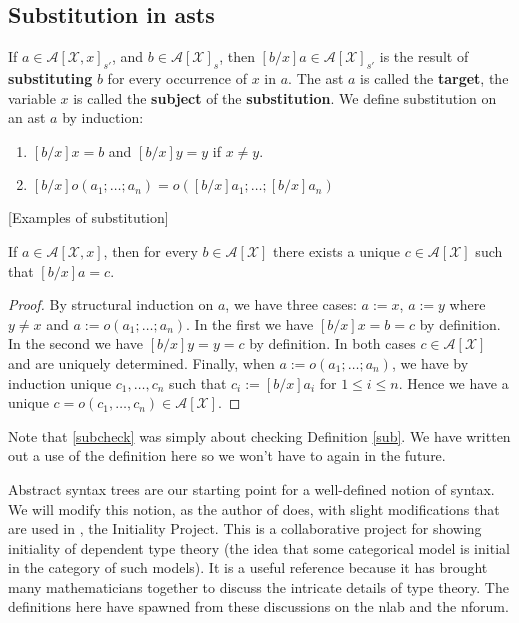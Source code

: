 \subsection{Substitution in asts}

\begin{defin}[Substitution]\label{sub}
    If $a \in \mathcal{A}[\mathcal{X},x]_{s'}$, and $b \in \mathcal{A}[\mathcal{X}]_s$, then $[b/x]a \in \mathcal{A}[\mathcal{X}]_{s'}$ is the result of \textbf{substituting} $b$ for every occurrence of $x$ in $a$. The ast $a$ is called the \textbf{target}, the variable $x$ is called the \textbf{subject} of the \textbf{substitution}. We define substitution on an ast $a$ by induction:
    \begin{enumerate}
        \item $[b/x]x = b$ and $[b/x]y = y$ if $x\ne y$.
        \item $[b/x]o(a_1;\dots;a_n)=o([b/x]a_1;\dots;[b/x]a_n)$
    \end{enumerate}
\end{defin}

[Examples of substitution]

\begin{cor}\label{subcheck}
    If $a \in \mathcal{A}[\mathcal{X},x]$, then for every $b \in \mathcal{A}[\mathcal{X}]$ there exists a unique $c \in \mathcal{A}[\mathcal{X}]$ such that $[b/x]a = c$.
\end{cor}
\begin{proof}
    By structural induction on $a$, we have three cases: $a := x$, $a:=y$ where $y \ne x$ and $a := o(a_1; \dots; a_n)$. In the first we have $[b/x]x=b=c$ by definition. In the second we have $[b/x]y=y=c$ by definition. In both cases $c \in \mathcal{A}[\mathcal{X}]$ and are uniquely determined. Finally, when $a := o(a_1; \dots; a_n)$, we have by induction unique $c_1,\dots, c_n$ such that $c_i:=[b/x]a_i$ for $1 \le i \le n$. Hence we have a unique $c=o(c_1,\dots,c_n) \in \mathcal{A}[\mathcal{X}]$.
\end{proof}

\begin{remark}
    Note that \ref{subcheck} was simply about checking Definition \ref{sub}. We have written out a use of the definition here so we won't have to again in the future.
\end{remark}

Abstract syntax trees are our starting point for a well-defined notion of syntax. We will modify this notion, as the author of \cite{harper_2016} does, with slight modifications that are used in \cite{nlab:initiality_project, nlab:initiality_project_-_raw_syntax}, the Initiality Project. This is a collaborative project for showing initiality of dependent type theory (the idea that some categorical model is initial in the category of such models). It is a useful reference because it has brought many mathematicians together to discuss the intricate details of type theory. The definitions here have spawned from these discussions on the nlab and the nforum.

